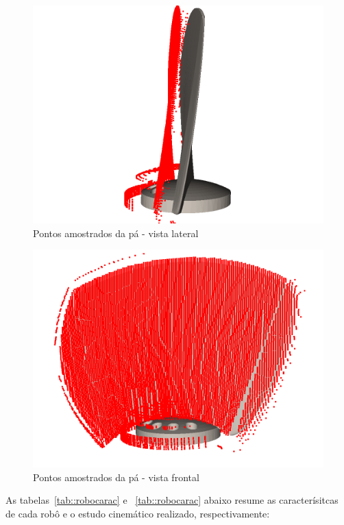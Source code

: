 \begin{figure}[h!]	
	\includegraphics[width=\columnwidth]{figs/bighatch/amostrapa1.png}
	\caption{Pontos amostrados da pá - vista lateral}
	\label{fig::amostrapa1}
\end{figure}

\begin{figure}[h!]	
	\includegraphics[width=\columnwidth]{figs/bighatch/amostrapa2.png}
	\caption{Pontos amostrados da pá - vista frontal}
	\label{fig::amostrapa2}
\end{figure}

As tabelas~\ref{tab::robocarac} e ~\ref{tab::robocarac} abaixo resume as
caracterísitcas de cada robô e o estudo cinemático realizado, respectivamente:

